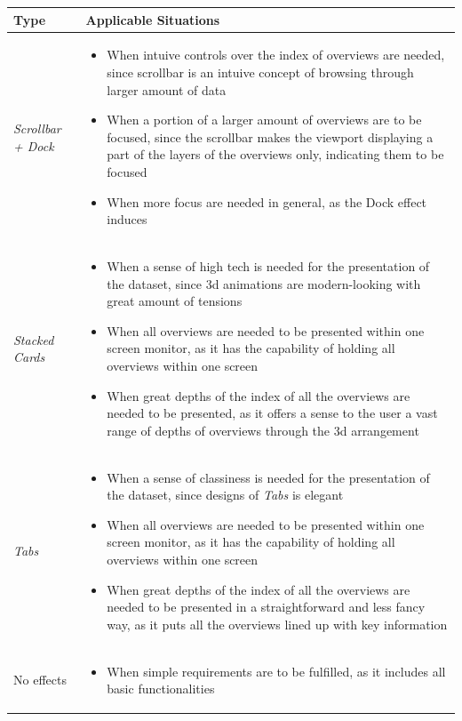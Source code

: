 \begingroup
\centering
\begin{tabu} to .97\textwidth { | X[1, r, m] | X[3, l, m] | }
    \hline
    Type & Applicable Situations \\
    \hline\hline
    \emph{Scrollbar + Dock} &
    \vspace{.85em}\begin{itemize}
        \item When intuive controls over the index of overviews are needed, since scrollbar is an intuive concept of browsing through larger amount of data
        \item When a portion of a larger amount of overviews are to be focused, since the scrollbar makes the viewport displaying a part of the layers of the overviews only, indicating them to be focused
        \item When more focus are needed in general, as the Dock effect induces
    \end{itemize} \\
    \hline
    \emph{Stacked Cards} &
    \vspace{.85em}\begin{itemize}
        \item When a sense of high tech is needed for the presentation of the dataset, since 3d animations are modern-looking with great amount of tensions
        \item When all overviews are needed to be presented within one screen monitor, as it has the capability of holding all overviews within one screen
        \item When great depths of the index of all the overviews are needed to be presented, as it offers a sense to the user a vast range of depths of overviews through the 3d arrangement
    \end{itemize} \\
    \hline
    \emph{Tabs} &
    \vspace{.85em}\begin{itemize}
        \item When a sense of classiness is needed for the presentation of the dataset, since designs of \emph{Tabs} is elegant
        \item When all overviews are needed to be presented within one screen monitor, as it has the capability of holding all overviews within one screen
        \item When great depths of the index of all the overviews are needed to be presented in a straightforward and less fancy way, as it puts all the overviews lined up with key information
    \end{itemize} \\
    \hline
    No effects & 
    \vspace{.85em}\begin{itemize}
        \item When simple requirements are to be fulfilled, as it includes all basic functionalities
    \end{itemize} \\
    \hline
\end{tabu}
\label{tbl:overview:app}
\endgroup

